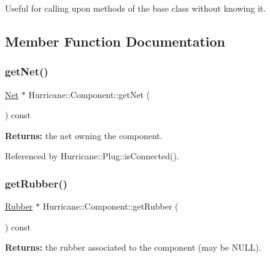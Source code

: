 Useful for calling upon methods of the base class without knowing it. 

\subsection{Member Function Documentation}
\mbox{\label{classHurricane_1_1Component_a1556ef77d6b89bfc17698d52ebde9791}} 
\subsubsection{\texorpdfstring{get\+Net()}{getNet()}}
{\footnotesize\ttfamily \mbox{\hyperlink{classHurricane_1_1Net}{Net}} $\ast$ Hurricane\+::\+Component\+::get\+Net (\begin{DoxyParamCaption}{ }\end{DoxyParamCaption}) const\hspace{0.3cm}{\ttfamily [inline]}}

{\bfseries Returns\+:} the net owning the component. 

Referenced by Hurricane\+::\+Plug\+::is\+Connected().

\mbox{\label{classHurricane_1_1Component_ab701515debfdf1bf4142d4d917aaab1d}} 
\subsubsection{\texorpdfstring{get\+Rubber()}{getRubber()}}
{\footnotesize\ttfamily \mbox{\hyperlink{classHurricane_1_1Rubber}{Rubber}} $\ast$ Hurricane\+::\+Component\+::get\+Rubber (\begin{DoxyParamCaption}{ }\end{DoxyParamCaption}) const\hspace{0.3cm}{\ttfamily [inline]}}

{\bfseries Returns\+:} the rubber associated to the component (may be N\+U\+LL). \mbox{\label{classHurricane_1_1Component_a19f06d7cad163bab3b97a13f4736c9d1}} 
